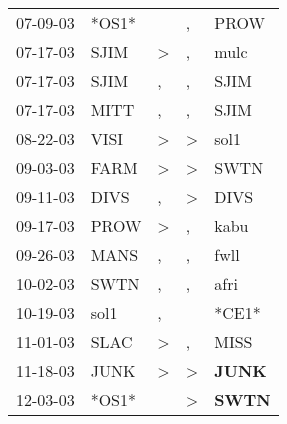 \begin{supertabular}{p{0.07\textwidth}p{0.06\textwidth}p{0.02\textwidth}p{0.02\textwidth}p{0.06\textwidth}}
          07-09-03\textsuperscript{} &                            *OS1* &                  &                , &           PROW\textsuperscript{} \\
          07-17-03\textsuperscript{} &           SJIM\textsuperscript{} &     \textgreater &                , &           mulc\textsuperscript{} \\
          07-17-03\textsuperscript{} &           SJIM\textsuperscript{} &                , &                , &           SJIM\textsuperscript{} \\
          07-17-03\textsuperscript{} &           MITT\textsuperscript{} &                , &                , &           SJIM\textsuperscript{} \\
          08-22-03\textsuperscript{} &           VISI\textsuperscript{} &     \textgreater &     \textgreater &           sol1\textsuperscript{} \\
          09-03-03\textsuperscript{} &           FARM\textsuperscript{} &     \textgreater &     \textgreater &           SWTN\textsuperscript{} \\
          09-11-03\textsuperscript{} &           DIVS\textsuperscript{} &                , &     \textgreater &           DIVS\textsuperscript{} \\
          09-17-03\textsuperscript{} &           PROW\textsuperscript{} &     \textgreater &                , &           kabu\textsuperscript{} \\
          09-26-03\textsuperscript{} &           MANS\textsuperscript{} &                , &                , &           fwll\textsuperscript{} \\
          10-02-03\textsuperscript{} &           SWTN\textsuperscript{} &                , &                , &           afri\textsuperscript{} \\
          10-19-03\textsuperscript{} &           sol1\textsuperscript{} &                , &                  &                            *CE1* \\
          11-01-03\textsuperscript{} &           SLAC\textsuperscript{} &     \textgreater &                , &           MISS\textsuperscript{} \\
          11-18-03\textsuperscript{} &           JUNK\textsuperscript{} &     \textgreater &     \textgreater &  \textbf{JUNK\textsuperscript{}} \\
          12-03-03\textsuperscript{} &                            *OS1* &                  &     \textgreater &  \textbf{SWTN\textsuperscript{}} \\

\end{supertabular}
